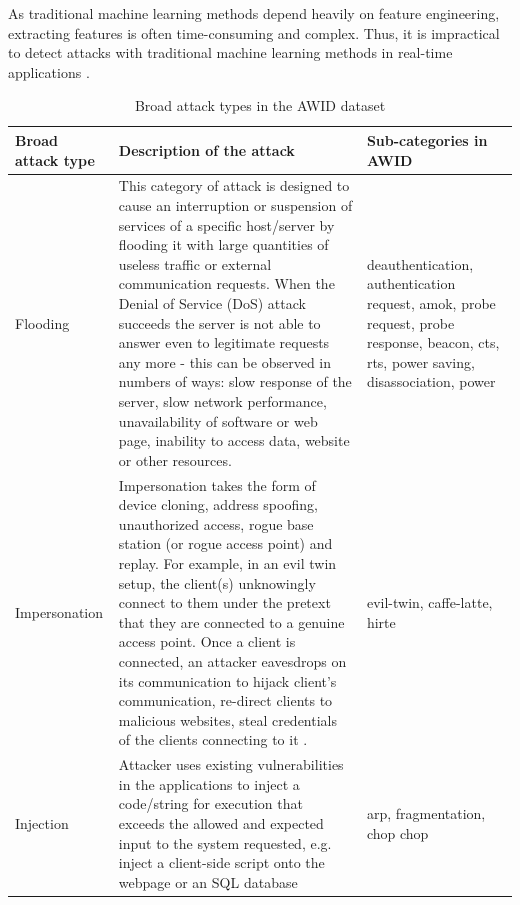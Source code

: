 \documentclass[letterpaper, 10pt, conference]{ieeeconf} %
\newcommand{\otoprule}{\midrule[\heavyrulewidth]}
\begin{document}
As traditional machine learning methods depend heavily on feature engineering, extracting features is often time-consuming and complex. Thus, it is impractical to detect attacks with traditional machine learning methods in real-time applications \cite{LIU2018}. 
  \begin{table}[t]
\centering
\caption{ Broad attack types in the AWID dataset \cite{AWID,AWID_main} }
\label{table:KDD}
{\def\arraystretch{1.35}\tabcolsep=10pt
\begin{tabular}{p{2cm} p{9.5cm} p{3.5cm} }
\toprule
Broad attack type 	& Description of the attack &	Sub-categories in AWID 	\\
\otoprule


Flooding
 & {This category of attack is designed to cause an interruption or suspension of services of a specific host/server by flooding it with large quantities of useless traffic or external communication requests. When the Denial of Service (DoS) attack succeeds the server is not able to answer even to legitimate requests any more - this can be observed in numbers of ways: slow response of the server, slow network performance, unavailability of software or web page, inability to access data, website or other resources. } &	{deauthentication, authentication request, amok, probe request, probe response, beacon, cts, rts, power saving, disassociation, power} \\
Impersonation & {Impersonation takes the form of device cloning, address spoofing, unauthorized access, rogue base station (or rogue access point) and replay. For example, in an evil twin setup, the client(s) unknowingly connect to them under the pretext that they are connected to a genuine access point. Once a client is connected, an attacker eavesdrops on its communication to hijack client’s communication, re-direct clients to malicious websites, steal credentials of the clients connecting to it \cite{aminanto2017improving, Agarwal2018Evil_twin}. }	& {evil-twin, caffe-latte, hirte}\\

Injection 
 & {Attacker uses existing vulnerabilities in the applications to inject a code/string for execution that exceeds the allowed and expected input to the system requested, e.g.  inject a client-side script onto the webpage or an SQL database} &	{arp, fragmentation, chop chop}\\



\bottomrule
\end{tabular}}
\end{table}
\end{document}
